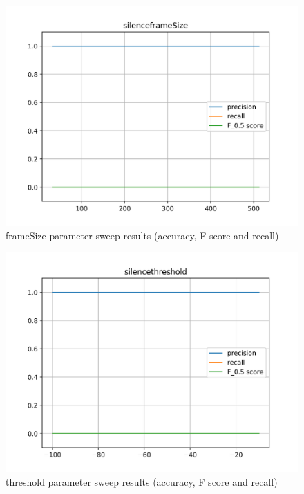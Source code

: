 \begin{figure}[!ht]
	\includegraphics[clip,width=\columnwidth]{Figures/silenceframeSize.png}%
	\caption{frameSize parameter sweep results (accuracy, F score and recall)}
	\label{fig:silenceframeSize}
\end{figure}

\begin{figure}[!ht]
	\includegraphics[clip,width=\columnwidth]{Figures/silencethreshold.png}%
	\caption{threshold parameter sweep results (accuracy, F score and recall)}
	\label{fig:silencethreshold}
\end{figure}

\newpage


